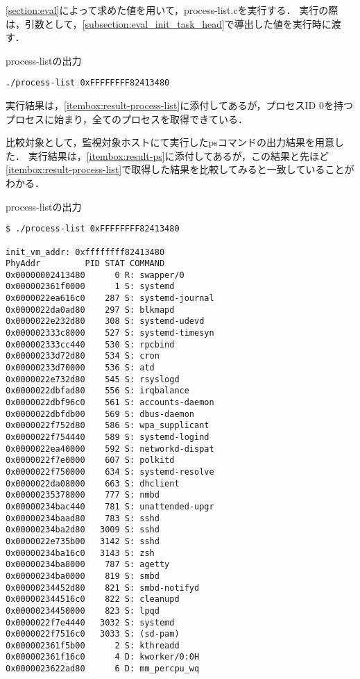 \ref{section:eval}によって求めた値を用いて，process-list.cを実行する．
実行の際は，引数として，\ref{subsection:eval_init_task_head}で導出した値を実行時に渡す．

\begin{itembox}[l]{process-listの出力}
    \begin{verbatim}
./process-list 0xFFFFFFFF82413480
    \end{verbatim}
\end{itembox}

実行結果は，\ref{itembox:result-process-list}に添付してあるが，プロセスID 0を持つプロセスに始まり，全てのプロセスを取得できている．

比較対象として，監視対象ホストにて実行したpsコマンドの出力結果を用意した．
実行結果は，\ref{itembox:result-ps}に添付してあるが，この結果と先ほど\ref{itembox:result-process-list}で取得した結果を比較してみると一致していることがわかる．

\begin{itembox}[l]{process-listの出力}
    \label{itembox:result-process-list}
    \begin{verbatim}
$ ./process-list 0xFFFFFFFF82413480

init_vm_addr: 0xffffffff82413480
PhyAddr         PID STAT COMMAND
0x00000002413480      0 R: swapper/0
0x000002361f0000      1 S: systemd
0x0000022ea616c0    287 S: systemd-journal
0x0000022da0ad80    297 S: blkmapd
0x0000022e232d80    308 S: systemd-udevd
0x000002333c8000    527 S: systemd-timesyn
0x000002333cc440    530 S: rpcbind
0x00000233d72d80    534 S: cron
0x00000233d70000    536 S: atd
0x0000022e732d80    545 S: rsyslogd
0x0000022dbfad80    556 S: irqbalance
0x0000022dbf96c0    561 S: accounts-daemon
0x0000022dbfdb00    569 S: dbus-daemon
0x0000022f752d80    586 S: wpa_supplicant
0x0000022f754440    589 S: systemd-logind
0x0000022ea40000    592 S: networkd-dispat
0x0000022f7e0000    607 S: polkitd
0x0000022f750000    634 S: systemd-resolve
0x0000022da08000    663 S: dhclient
0x00000235378000    777 S: nmbd
0x00000234bac440    781 S: unattended-upgr
0x00000234baad80    783 S: sshd
0x00000234ba2d80   3009 S: sshd
0x0000022e735b00   3142 S: sshd
0x00000234ba16c0   3143 S: zsh
0x00000234ba8000    787 S: agetty
0x00000234ba0000    819 S: smbd
0x00000234452d80    821 S: smbd-notifyd
0x000002344516c0    822 S: cleanupd
0x00000234450000    823 S: lpqd
0x0000022f7e4440   3032 S: systemd
0x0000022f7516c0   3033 S: (sd-pam)
0x000002361f5b00      2 S: kthreadd
0x000002361f16c0      4 D: kworker/0:0H
0x0000023622ad80      6 D: mm_percpu_wq
    \end{verbatim}
\end{itembox}

